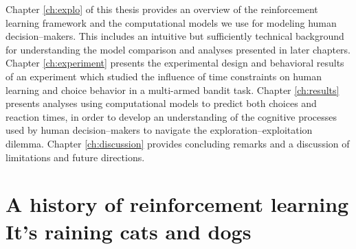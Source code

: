 Chapter \ref{ch:explo} of this thesis provides an overview of the reinforcement learning framework and the computational models we use for modeling human decision--makers. This includes an intuitive but sufficiently technical background for understanding the model comparison and analyses presented in later chapters.
Chapter \ref{ch:experiment} presents the experimental design and behavioral results of an experiment which studied the influence of time constraints on human learning and choice behavior in a multi-armed bandit task. 
Chapter \ref{ch:results} presents analyses using computational models to predict both choices and reaction times, in order to develop an understanding of the cognitive processes used by human decision--makers to navigate the exploration--exploitation dilemma. Chapter \ref{ch:discussion} provides concluding remarks and a discussion of limitations and future directions. 

\section[ A history of reinforcement learning. It's raining cats and dogs]{A history of reinforcement learning\\ {\large It's raining cats and dogs}} 

